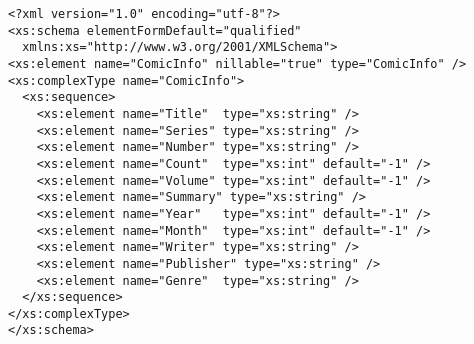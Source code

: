 \documentclass[../../../thesis]{subfiles}
\begin{document}
\begin{appendices}
\begin{verbatim}
<?xml version="1.0" encoding="utf-8"?>
<xs:schema elementFormDefault="qualified"
  xmlns:xs="http://www.w3.org/2001/XMLSchema">
<xs:element name="ComicInfo" nillable="true" type="ComicInfo" />
<xs:complexType name="ComicInfo">
  <xs:sequence>
    <xs:element name="Title"  type="xs:string" />
    <xs:element name="Series" type="xs:string" />
    <xs:element name="Number" type="xs:string" />
    <xs:element name="Count"  type="xs:int" default="-1" />
    <xs:element name="Volume" type="xs:int" default="-1" />
    <xs:element name="Summary" type="xs:string" />
    <xs:element name="Year"   type="xs:int" default="-1" />
    <xs:element name="Month"  type="xs:int" default="-1" />
    <xs:element name="Writer" type="xs:string" />
    <xs:element name="Publisher" type="xs:string" />
    <xs:element name="Genre"  type="xs:string" />
  </xs:sequence>
</xs:complexType>
</xs:schema>
\end{verbatim}

\end{appendices}
\end{document}
